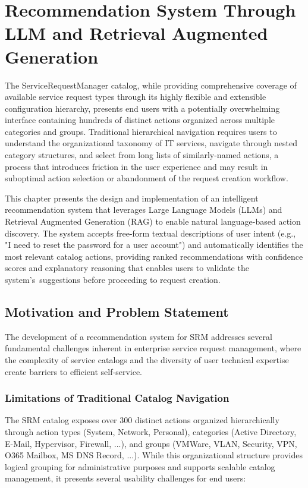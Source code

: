 \chapter{Recommendation System Through LLM and Retrieval Augmented Generation}

The ServiceRequestManager catalog, while providing comprehensive coverage of available service request types through its highly flexible and extensible configuration hierarchy, presents end users with a potentially overwhelming interface containing hundreds of distinct actions organized across multiple categories and groups. Traditional hierarchical navigation requires users to understand the organizational taxonomy of IT services, navigate through nested category structures, and select from long lists of similarly-named actions, a process that introduces friction in the user experience and may result in suboptimal action selection or abandonment of the request creation workflow.

This chapter presents the design and implementation of an intelligent recommendation system that leverages Large Language Models (LLMs) and Retrieval Augmented Generation (RAG) to enable natural language-based action discovery. The system accepts free-form textual descriptions of user intent (e.g., "I need to reset the password for a user account") and automatically identifies the most relevant catalog actions, providing ranked recommendations with confidence scores and explanatory reasoning that enables users to validate the system's~suggestions before proceeding to request creation.

\section{Motivation and Problem Statement}

The development of a recommendation system for SRM addresses several fundamental challenges inherent in enterprise service request management, where the complexity of service catalogs and the diversity of user technical expertise create barriers to efficient self-service.

\subsection{Limitations of Traditional Catalog Navigation}

The SRM catalog exposes over 300 distinct actions organized hierarchically through action types (System, Network, Personal), categories (Active Directory, E-Mail, Hypervisor, Firewall, ...), and groups (VMWare, VLAN, Security, VPN, O365 Mailbox, MS DNS Record, ...). While this organizational structure provides logical grouping for administrative purposes and supports scalable catalog management, it presents several usability challenges for end users:

